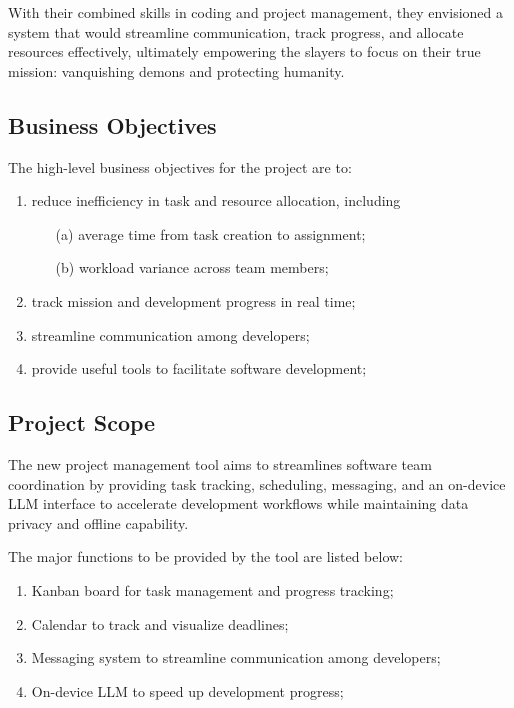 \documentclass[11pt]{article}
\begin{document}
With their combined skills in coding and project management, they envisioned a system that
would streamline communication, track progress, and allocate resources effectively, ultimately
empowering the slayers to focus on their true mission: vanquishing demons and protecting
humanity.

\subsection{Business Objectives}
The high-level business objectives for the project are to:
\begin{enumerate}
    \item reduce inefficiency in task and resource allocation, including
    \begin{itemize}%
        \item[(a)] average time from task creation to assignment;
        \item[(b)] workload variance across team members;
    \end{itemize}
    \item track mission and development progress in real time;
    \item streamline communication among developers;
    \item provide useful tools to facilitate software development;
\end{enumerate}

\subsection{Project Scope}
The new project management tool aims to streamlines software team coordination by 
providing task tracking, scheduling, messaging, and an on-device LLM interface to accelerate
development workflows while maintaining data privacy and offline capability.

The major functions to be provided by the tool are listed below:
\begin{enumerate}
    \item Kanban board for task management and progress tracking;
    \item Calendar to track and visualize deadlines;
    \item Messaging system to streamline communication among developers;
    \item On-device LLM to speed up development progress;
\end{enumerate}

\end{document}
